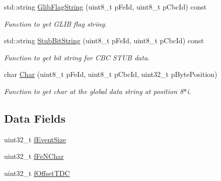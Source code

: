 \begin{DoxyCompactItemize}
std\-::string \hyperlink{class_ph2___hw_interface_1_1_event_a8b6a50a409927366a830084f11885882}{Glib\-Flag\-String} (uint8\-\_\-t p\-Fe\-Id, uint8\-\_\-t p\-Cbc\-Id) const 
\begin{DoxyCompactList}\small\item\em Function to get G\-L\-I\-B flag string. \end{DoxyCompactList}\item 
std\-::string \hyperlink{class_ph2___hw_interface_1_1_event_abc647a9563bd796f8785590a2b5b525b}{Stub\-Bit\-String} (uint8\-\_\-t p\-Fe\-Id, uint8\-\_\-t p\-Cbc\-Id) const 
\begin{DoxyCompactList}\small\item\em Function to get bit string for C\-B\-C S\-T\-U\-B data. \end{DoxyCompactList}\item 
char \hyperlink{class_ph2___hw_interface_1_1_event_a348abea85bdfdfc8c0b88cda907dbea8}{Char} (uint8\-\_\-t p\-Fe\-Id, uint8\-\_\-t p\-Cbc\-Id, uint32\-\_\-t p\-Byte\-Position)
\begin{DoxyCompactList}\small\item\em Function to get char at the global data string at position 8$\ast$i. \end{DoxyCompactList}\end{DoxyCompactItemize}
\subsection*{Data Fields}
\begin{DoxyCompactItemize}
\item 
uint32\-\_\-t \hyperlink{class_ph2___hw_interface_1_1_event_a0a12db10e67652851517cc65c8057667}{f\-Event\-Size}
\item 
uint32\-\_\-t \hyperlink{class_ph2___hw_interface_1_1_event_a4d5cdd6c250eecb7bfd2f0ee3b1056a4}{f\-Fe\-N\-Char}
\item 
uint32\-\_\-t \hyperlink{class_ph2___hw_interface_1_1_event_afd3160b2830469808d9f671bfbedfd55}{f\-Offset\-T\-D\-C}
\end{DoxyCompactItemize}
